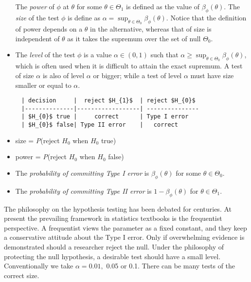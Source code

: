 \documentclass[11pt]{article}
\providecommand{\tightlist}{%
      \setlength{\itemsep}{0pt}\setlength{\parskip}{0pt}}
\begin{document}
\begin{itemize}
  The \emph{power} of \(\phi\) at \(\theta\) for some
  \(\theta\in\Theta_{1}\) is defined as the value of
  \(\beta_{\phi}\left(\theta\right)\). 
  The \emph{size} of the test \(\phi\) is define as
  \(\alpha=\sup_{\theta\in\Theta_{0}}\beta_{\phi}\left(\theta\right).\)
  Notice that the definition of power depends on a \(\theta\) in the
  alternative, whereas that of size is independent of \(\theta\) as it
  takes the supremum over the set of null \(\Theta_0\).
\item
  The \emph{level} of the test \(\phi\) is a value
  \(\alpha\in\left(0,1\right)\) such that
  \(\alpha\geq\sup_{\theta\in\Theta_{0}}\beta_{\phi}\left(\theta\right)\),
  which is often used when it is difficult to attain the exact supremum.
  A test of size $\alpha$ is also of level $\alpha$ or bigger; while a test of level $\alpha$
  must have size smaller or equal to $\alpha$.
\end{itemize}

    \begin{verbatim}
     | decision     |  reject $H_{1}$  | reject $H_{0}$
     |--------------|------------------| ---------------
     | $H_{0}$ true |     correct      | Type I error
     | $H_{0}$ false| Type II error    |   correct
\end{verbatim}

    \begin{itemize}
\tightlist
\item
  size = \emph{P}(reject \(H_{0}\) when \(H_{0}\) true)
\item
  power = \emph{P}(reject \(H_{0}\) when \(H_{0}\) false)
\item
  The \emph{probability of committing Type I error} is
  \(\beta_{\phi}\left(\theta\right)\) for some \(\theta\in\Theta_{0}\).
\item
  The \emph{probability of committing Type II error} is
  \(1-\beta_{\phi}\left(\theta\right)\) for \(\theta\in\Theta_{1}\).
\end{itemize}

    The philosophy on the hypothesis testing has been debated for centuries.
At present the prevailing framework in statistics textbooks is the
frequentist perspective. A frequentist views the parameter as a fixed
constant, and they keep a conservative attitude about the Type I error.
Only if overwhelming evidence is demonstrated should a researcher reject
the null. Under the philosophy of protecting the null hypothesis, a
desirable test should have a small level. Conventionally we take
\(\alpha=0.01,\) 0.05 or 0.1. There can be many tests of the correct
size.
\end{document}
